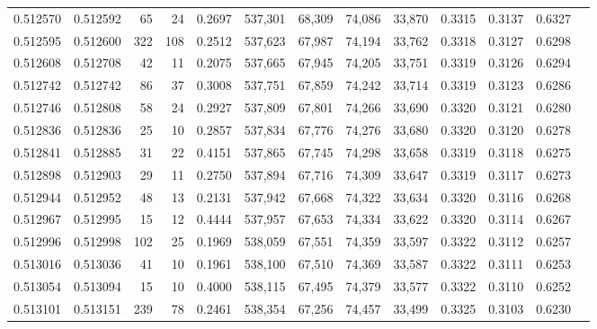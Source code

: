 \begin{tabular}{rrrrrrrrrrrrr}
0.512570 & 0.512592 &    65 &    24 &                                     0.2697 & 537,301 &  68,309 &  74,086 &  33,870 & 0.3315 & 0.3137 & 0.6327 \\
0.512595 & 0.512600 &   322 &   108 &                                     0.2512 & 537,623 &  67,987 &  74,194 &  33,762 & 0.3318 & 0.3127 & 0.6298 \\
0.512608 & 0.512708 &    42 &    11 &                                     0.2075 & 537,665 &  67,945 &  74,205 &  33,751 & 0.3319 & 0.3126 & 0.6294 \\
0.512742 & 0.512742 &    86 &    37 &                                     0.3008 & 537,751 &  67,859 &  74,242 &  33,714 & 0.3319 & 0.3123 & 0.6286 \\
0.512746 & 0.512808 &    58 &    24 &                                     0.2927 & 537,809 &  67,801 &  74,266 &  33,690 & 0.3320 & 0.3121 & 0.6280 \\
0.512836 & 0.512836 &    25 &    10 &                                     0.2857 & 537,834 &  67,776 &  74,276 &  33,680 & 0.3320 & 0.3120 & 0.6278 \\
0.512841 & 0.512885 &    31 &    22 &                                     0.4151 & 537,865 &  67,745 &  74,298 &  33,658 & 0.3319 & 0.3118 & 0.6275 \\
0.512898 & 0.512903 &    29 &    11 &                                     0.2750 & 537,894 &  67,716 &  74,309 &  33,647 & 0.3319 & 0.3117 & 0.6273 \\
0.512944 & 0.512952 &    48 &    13 &                                     0.2131 & 537,942 &  67,668 &  74,322 &  33,634 & 0.3320 & 0.3116 & 0.6268 \\
0.512967 & 0.512995 &    15 &    12 &                                     0.4444 & 537,957 &  67,653 &  74,334 &  33,622 & 0.3320 & 0.3114 & 0.6267 \\
0.512996 & 0.512998 &   102 &    25 &                                     0.1969 & 538,059 &  67,551 &  74,359 &  33,597 & 0.3322 & 0.3112 & 0.6257 \\
0.513016 & 0.513036 &    41 &    10 &                                     0.1961 & 538,100 &  67,510 &  74,369 &  33,587 & 0.3322 & 0.3111 & 0.6253 \\
0.513054 & 0.513094 &    15 &    10 &                                     0.4000 & 538,115 &  67,495 &  74,379 &  33,577 & 0.3322 & 0.3110 & 0.6252 \\
0.513101 & 0.513151 &   239 &    78 &                                     0.2461 & 538,354 &  67,256 &  74,457 &  33,499 & 0.3325 & 0.3103 & 0.6230 \\

\end{tabular}
